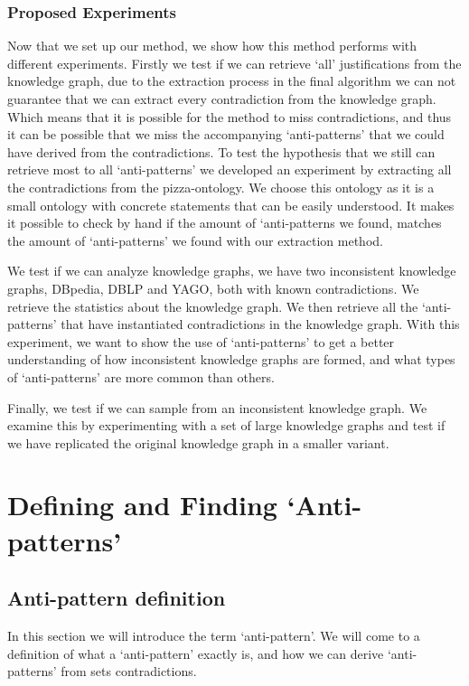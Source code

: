 \documentclass[11pt,letterpaper ,oneside ]{book}
\begin{document}
	\subsection{Proposed Experiments}
	Now that we set up our method, we show how this method performs with different experiments. 
	Firstly we test if we can retrieve `all' justifications from the knowledge graph, due to the extraction process in the final algorithm we can not guarantee that we can extract every contradiction from the knowledge graph. Which means that it is possible for the method to miss contradictions, and thus it can be possible that we miss the accompanying `anti-patterns' that we could have derived from the contradictions. To test the hypothesis that we still can retrieve most to all `anti-patterns' we developed an experiment by extracting all the contradictions from the pizza-ontology. We choose this ontology as it is a small ontology with concrete statements that can be easily understood. It makes it possible to check by hand if the amount of `anti-patterns we found, matches the amount of `anti-patterns' we found with our extraction method.
	
	We test if we can analyze knowledge graphs, we have two inconsistent knowledge graphs, DBpedia, DBLP and YAGO, both with known contradictions. We retrieve the statistics about the knowledge graph. We then retrieve all the `anti-patterns' that have instantiated contradictions in the knowledge graph. 
	With this experiment, we want to show the use of `anti-patterns' to get a better understanding of how inconsistent knowledge graphs are formed, and what types of `anti-patterns' are more common than others.
	
	Finally, we test if we can sample from an inconsistent knowledge graph. We examine this by experimenting with a set of large knowledge graphs and test if we have replicated the original knowledge graph in a smaller variant.
	
	\newpage
	\chapter{Defining and Finding `Anti-patterns'}\label{Method}
	\section{Anti-pattern definition}\label{AntiPatternDefinition}
	In this section we will introduce the term `anti-pattern'. We will come to a definition of what a `anti-pattern' exactly is, and how we can derive `anti-patterns' from sets contradictions. \\
	
\end{document}
